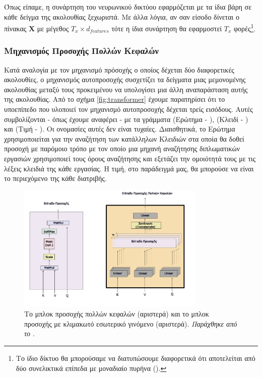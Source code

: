 Όπως είπαμε, η συνάρτηση του νευρωνικού δικτύου εφαρμόζεται με τα ίδια βάρη σε κάθε δείγμα της ακολουθίας ξεχωριστά. Με άλλα λόγια, αν σαν είσοδο δίνεται ο πίνακας $\boldsymbol{X}$ με μέγεθος $T_x \times d_{features}$ τότε η ίδια συνάρτηση θα εφαρμοστεί $T_x$ φορές\footnote{Το ίδιο δίκτυο θα μπορούσαμε να διατυπώσουμε διαφορετικά ότι αποτελείται από δύο συνελικτικά επίπεδα με μοναδιαίο πυρήνα ().}. \par

\subsubsection{Μηχανισμός Προσοχής Πολλών Κεφαλών}
Κατά αναλογία με τον μηχανισμό πρόσοχής ο οποίος δέχεται δύο διαφορετικές ακολουθίες, ο μηχανισμός αυτο\textendash προσοχής συσχετίζει τα δείγματα μιας μεμονομένης ακολουθίας μεταξύ τους προκειμένου να υπολογίσει μια άλλη αναπαράσταση αυτής της ακολουθίας. 
Από το σχήμα \ref{fig:transformer} έχουμε παρατηρίσει ότι το υπο\textendash επίπεδο που υλοποιεί τον μηχανισμό αυτοπροσοχής δέχεται τρείς εισόδους. Αυτές συμβολίζονται - όπως έχουμε αναφέρει - με τα γράμματα  (Ερώτημα - ),  (Κλειδί - ) και  (Τιμή - ). Οι ονομασίες αυτές δεν είναι τυχαίες. Διαισθητικά, το Ερώτημα χρησιμοποιείται για την αναζήτηση των κατάλληλων Κλειδιών στα οποία θα δοθεί προσοχή με παρόμοιο τρόπο με τον οποίο μια μηχανή αναζήτησης διπλωματικών εργασιών χρησιμοποιεί τους όρους αναζήτησης και εξετάζει την ομοιότητά τους με τις λέξεις κλειδιά της κάθε εργασίας. Η τιμή, στο παράδειγμά μας, θα μπορούσε να είναι το περιεχόμενο της κάθε διατριβής. \par

\begin{figure}[h]
  \centering
  \includegraphics[width=0.8\textwidth]{images/chapter theoritical background/transformer_attention_gr.pdf}
  \caption{Το μπλοκ προσοχής πολλών κεφαλών (αριστερά) και το μπλοκ προσοχής με κλιμακωτό εσωτερικό γινόμενο (αριστερά). \textit{Παράχθηκε από το \href{https://inkscape.org/}{}}.}
  \label{fig:transformer_multi_head}
\end{figure}

